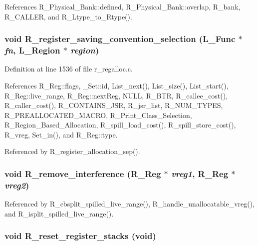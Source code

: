 References R\_\-Physical\_\-Bank::defined, R\_\-Physical\_\-Bank::overlap, R\_\-bank, R\_\-CALLER, and R\_\-Ltype\_\-to\_\-Rtype().
\subsubsection{\setlength{\rightskip}{0pt plus 5cm}void R\_\-register\_\-saving\_\-convention\_\-selection (L\_\-Func $\ast$ {\em fn}, L\_\-Region $\ast$ {\em region})}\label{r__regproto_8h_9af90de44d134252172d0a091e080125}




Definition at line 1536 of file r\_\-regalloc.c.

References R\_\-Reg::flags, \_\-Set::id, List\_\-next(), List\_\-size(), List\_\-start(), R\_\-Reg::live\_\-range, R\_\-Reg::next\-Reg, NULL, R\_\-BTR, R\_\-callee\_\-cost(), R\_\-caller\_\-cost(), R\_\-CONTAINS\_\-JSR, R\_\-jsr\_\-list, R\_\-NUM\_\-TYPES, R\_\-PREALLOCATED\_\-MACRO, R\_\-Print\_\-Class\_\-Selection, R\_\-Region\_\-Based\_\-Allocation, R\_\-spill\_\-load\_\-cost(), R\_\-spill\_\-store\_\-cost(), R\_\-vreg, Set\_\-in(), and R\_\-Reg::type.

Referenced by R\_\-register\_\-allocation\_\-sep().
\subsubsection{\setlength{\rightskip}{0pt plus 5cm}void R\_\-remove\_\-interference (\bf{R\_\-Reg} $\ast$ {\em vreg1}, \bf{R\_\-Reg} $\ast$ {\em vreg2})}\label{r__regproto_8h_d310f7a6360829fd7b24617a45932e77}




Referenced by R\_\-cbsplit\_\-spilled\_\-live\_\-range(), R\_\-handle\_\-unallocatable\_\-vreg(), and R\_\-isplit\_\-spilled\_\-live\_\-range().
\subsubsection{\setlength{\rightskip}{0pt plus 5cm}void R\_\-reset\_\-register\_\-stacks (void)}\label{r__regproto_8h_ae2564b03360930948686a839eef4411}




